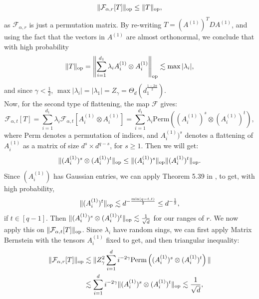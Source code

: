 \documentclass[]{article}
\numberwithin{equation}{section}
\theoremstyle{definition}
\def\op{{\rm op}}
\begin{document}
\begin{equation}
    \|\mathcal{F}_{\alpha,r}[T] \|_\op \leq \|T\|_\op, 
\end{equation}
as $\mathcal{F}_{\alpha,r}$ is just a permutation matrix. By re-writing $T = (A^{(1)})^T D A^{(1)}$, and using the fact that the vectors in $A^{(1)}$ are almost orthonormal, we conclude that with high probability
\begin{equation}
    \| T\|_\op = \left \| \sum_{i=1}^{d_1}
\lambda_i A_{i}^{(1)} \otimes A_{i}^{(1)} \right \|_\op \lesssim \max |\lambda_{i}| ,
\label{eq:flattening_type_1}
\end{equation}
and since $\gamma < \frac{1}{2}$, $\max |\lambda_{i}| = |\lambda_1 |= Z_\gamma = \Theta_{d}(d_1^{\frac{1-2\alpha}{2}})$. \\ 


Now, for the second type of flattening, the map $\mathcal{F}$ gives: 
\begin{equation}
    \mathcal{F}_{\alpha, t}[T] = \sum_{i=1}^{d_1} \lambda_i \mathcal{F}_{\alpha, t}[ A_{i}^{(1)} \otimes A_i^{(1)}] = \sum_{i=1}^{d_1} \lambda_i \mathrm{Perm} \left ( (A_{i}^{(1)})^{s} \otimes (A_{i}^{(1)})^{t}  \right ),
\end{equation}
where $\mathrm{Perm}$ denotes a permutation of indices, and $A_{i}^{(1)})^{s}$ denotes a flattening of $A_i^{(1)}$ as a matrix of size $d^{s} \times d^{q-s}$, for $s \geq 1$. Then we will get: 
\begin{equation}
    \| (A_{i}^{(1)})^{s} \otimes (A_{i}^{(1)})^{t} \|_\op \leq \|(A_{i}^{(1)})^{s}\|_\op \| (A_{i}^{(1)})^{t} \|_\op. 
\end{equation}
Since $(A_{i}^{(1)})$ has Gaussian entries, we can apply Theorem 5.39 in \cite{V10}, to get, with high probability, 
\begin{equation}
    \| (A_{i}^{(1)})^{t} \|_\op \lesssim d^{-\frac{\min(q-t, t)}{2}} \leq d^{-\frac{1}{2}}, 
    \label{eq:flattened_A_bound}
\end{equation}
if $t \in [q-1]$. Then $\| (A_{i}^{(1)})^{s} \otimes (A_{i}^{(1)})^{t} \|_\op \lesssim \frac{1}{\sqrt{d}}$ for our ranges of $r$. We now apply this on $ \|\mathcal{F}_{\alpha, t}[T]\|_\op$. Since $\lambda_i$ have random sings, we can first apply Matrix Bernstein with the tensors $A^{(1)}_i$ fixed to get, and then triangular inequality: 
\begin{align}
    \| \mathcal{F}_{\alpha,r}[T]\|_\op &\lesssim \|Z_{\gamma}^2\sum_{i=1}^{d} i^{-2\gamma}  \mathrm{Perm} \left ( (A_{i}^{(1)})^{s} \otimes (A_{i}^{(1)})^{t} \right ) \| \\
    & \lesssim \sum_{i=1}^{d}i^{-2\gamma} \| (A_{i}^{(1)})^{s} \otimes (A_{i}^{(1)})^{t} \|_\op \lesssim \dfrac{1}{\sqrt{d}},
    \label{eq:flattening_type_2}
\end{align}
\end{document}
